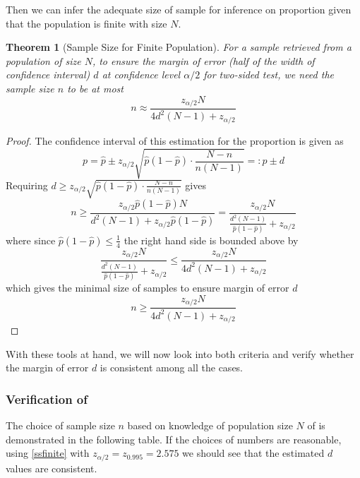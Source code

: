 \documentclass[12pt]{article}
\newtheorem{theorem}{Theorem}[section]
\begin{document}
Then we can infer the adequate size of sample for inference on proportion given that the population is finite with size $N$. 

\begin{theorem}[Sample Size for Finite Population]
    For a sample retrieved from a population of size $N$, to ensure the margin of error (half of the width of confidence interval) $d$ at confidence level $\alpha/2$ for two-sided test, we need the sample size $n$ to be at most
    \begin{equation}\label{ssfinite}
    n\approx \dfrac{z_{\alpha/2}N}{4d^2(N-1)+z_{\alpha/2}}
    \end{equation}
\end{theorem}

\begin{proof}
    The confidence interval of this estimation for the proportion is given as
    $$
    p = \hat{p}\pm z_{\alpha/2} \sqrt{\hat{p}(1-\hat{p})\cdot \dfrac{N-n}{n(N-1)}} =: \hat{p} \pm d
    $$
    Requiring $d\geq z_{\alpha/2} \sqrt{\hat{p}(1-\hat{p})\cdot \frac{N-n}{n(N-1)}}$ gives
    $$
    n\geq \dfrac{z_{\alpha/2}\hat{p}(1-\hat{p})N}{d^2(N-1)+z_{\alpha/2}\hat{p}(1-\hat{p})} = \dfrac{z_{\alpha/2}N}{\frac{d^2(N-1)}{\hat{p}(1-\hat{p})}+z_{\alpha/2}}
    $$
    where since $\hat{p}(1-\hat{p})\leq\frac{1}{4}$ the right hand side is bounded above by
    $$
    \dfrac{z_{\alpha/2}N}{\frac{d^2(N-1)}{\hat{p}(1-\hat{p})}+z_{\alpha/2}} \leq \dfrac{z_{\alpha/2}N}{4d^2(N-1)+z_{\alpha/2}}
    $$
    which gives the minimal size of samples to ensure margin of error $d$
    $$
    n\geq \dfrac{z_{\alpha/2}N}{4d^2(N-1)+z_{\alpha/2}}
    $$
\end{proof}

With these tools at hand, we will now look into both criteria and verify whether the margin of error $d$ is consistent among all the cases.

\subsubsection{Verification of \cite{JJF2005}}

The choice of sample size $n$ based on knowledge of population size $N$ of \cite{JJF2005} is demonstrated in the following table. If the choices of numbers are reasonable, using \eqref{ssfinite} with $z_{\alpha/2} = z_{0.995} = 2.575$ we should see that the estimated $d$ values are consistent. 
\end{document}
